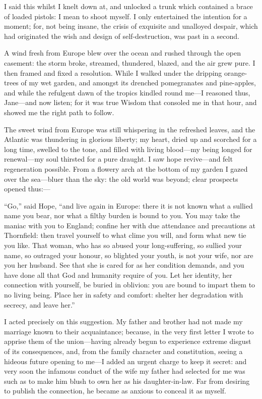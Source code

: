 {%
I said this whilst I knelt down at, and unlocked a trunk which
contained a brace of loaded pistols: I mean to shoot myself. I only
entertained the intention for a moment; for, not being insane, the
crisis of exquisite and unalloyed despair, which had originated the wish
and design of self-destruction, was past in a second.

A wind fresh from Europe blew over the ocean and rushed through the
open casement: the storm broke, streamed, thundered, blazed, and the air
grew pure. I then framed and fixed a resolution. While I walked under
the dripping orange-trees of my wet garden, and amongst its drenched
pomegranates and pine-apples, and while the refulgent dawn of the
tropics kindled round me---I reasoned thus, Jane---and now listen; for
it was true Wisdom that consoled me in that hour, and showed me the
right path to follow.

The sweet wind from Europe was still whispering in the refreshed
leaves, and the Atlantic was thundering in glorious liberty; my heart,
dried up and scorched for a long time, swelled to the tone, and filled
with living blood---my being longed for renewal---my soul thirsted for a
pure draught. I saw hope revive---and felt regeneration possible. From
a flowery arch at the bottom of my garden I gazed over the sea---bluer
than the sky: the old world was beyond; clear prospects opened thus:---

\enquote{Go,} said Hope, \enquote{and live again in Europe: there it
is not known what a sullied name you bear, nor what a filthy burden is
bound to you. You may take the maniac with you to England; confine her
with due attendance and precautions at Thornfield: then travel yourself
to what clime you will, and form what new tie you like. That woman, who
has so abused your long-suffering, so sullied your name, so outraged
your honour, so blighted your youth, is not your wife, nor are you her
husband. See that she is cared for as her condition demands, and you
have done all that God and humanity require of you. Let her identity,
her connection with yourself, be buried in oblivion: you are bound to
impart them to no living being. Place her in safety and comfort:
shelter her degradation with secrecy, and leave her.}

I acted precisely on this suggestion. My father and brother had not
made my marriage known to their acquaintance; because, in the very first
letter I wrote to apprise them of the union---having already begun to
experience extreme disgust of its consequences, and, from the family
character and constitution, seeing a hideous future opening to me---I
added an urgent charge to keep it secret: and very soon the infamous
conduct of the wife my father had selected for me was such as to make
him blush to own her as his daughter-in-law. Far from desiring to
publish the connection, he became as anxious to conceal it as myself.

}
